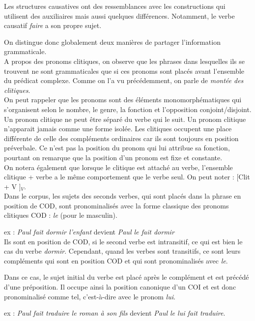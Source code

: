 Les structures causatives ont des ressemblances avec les constructions qui utilisent des auxiliaires mais aussi quelques différences.
Notamment, le verbe causatif \emph{faire} a son propre sujet.

On distingue donc globalement deux manières de partager l'information grammaticale.\\

A propos des pronoms clitiques, on observe que les phrases dans lesquelles ils se trouvent ne sont grammaticales que si ces pronoms sont placés avant l'ensemble du prédicat complexe.
Comme on l'a vu précédemment, on parle de \emph{montée des clitiques}.\\

On peut rappeler que les pronoms sont des éléments monomorphématiques qui s'organisent selon le nombre, le genre, la fonction et l'opposition conjoint/disjoint.
Un pronom clitique ne peut être séparé du verbe qui le suit.
Un pronom clitique n'apparait jamais comme une forme isolée.
Les clitiques occupent une place différente de celle des compléments ordinaires car ils sont toujours en position préverbale.
Ce n'est pas la position du pronom qui lui attribue sa fonction, pourtant on remarque que la position d'un pronom est fixe et constante.\\

On notera également que lorsque le clitique est attaché au verbe, l'ensemble clitique + verbe a le même comportement que le verbe seul.
On peut noter : [Clit + V ]$_V$.\\

Dans le corpus, les sujets des seconds verbes, qui sont placés dans la phrase en position de COD, sont pronominalisés avec la forme classique des pronoms clitiques COD : \emph{le} (pour le masculin).

ex : \emph{Paul fait dormir l'enfant} devient \emph{Paul le fait dormir}\\

Ils sont en position de COD, si le second verbe est intransitif, ce qui est bien le cas du verbe \emph{dormir}.
Cependant, quand les verbes sont transitifs, ce sont leurs compléments qui sont en position COD et qui sont pronominalisés avec \emph{le}.

Dans ce cas, le sujet initial du verbe est placé après le complément et est précédé d'une préposition.
Il occupe ainsi la position canonique d'un COI et est donc pronominalisé comme tel, c'est-à-dire avec le pronom \emph{lui}.

ex : \emph{Paul fait traduire le roman à son fils} devient \emph{Paul le lui fait traduire}.\\

